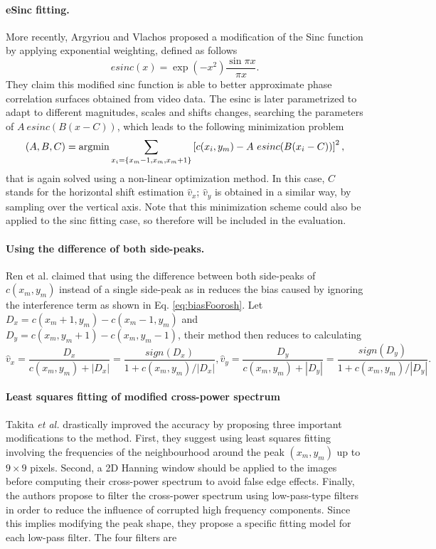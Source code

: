 \paragraph{eSinc fitting.}
More recently, Argyriou and Vlachos \cite{Argyriou2006} proposed a modification of the Sinc function by applying exponential weighting, defined as follows
\begin{equation}
esinc(x) = \exp(-x^2)\frac{\sin \pi x}{\pi x}.
\end{equation}
They claim this modified sinc function is able to better approximate phase correlation surfaces obtained from video data. The esinc is later parametrized to adapt to different magnitudes, scales and shifts changes, searching the parameters of $A \ esinc(B(x-C))$, which leads to the following minimization problem
\begin{equation}
(A,B,C) = \operatorname*{\arg\!\min} \sum_{x_i=\{x_m -1,x_m,x_m+1\}} \left[c(x_i,y_m) - A \ esinc(B(x_i-C))\right]^2,
\end{equation}
that is again solved using a non-linear optimization method. In this case, $C$ stands for the horizontal shift estimation $\hat{v}_x$; $\hat{v}_y$ is obtained in a similar way, by sampling over the vertical axis. Note that this minimization scheme could also be applied to the sinc fitting case, so therefore will be included in the evaluation.

\paragraph{Using the difference of both side-peaks.}
Ren et al. \cite{Ren_2010} claimed that using the difference between both side-peaks of $c(x_m,y_m)$ instead of a single side-peak as in \cite{Foroosh2002} reduces the bias caused by ignoring the interference term as shown in Eq. \eqref{eq:biasFoorosh}. Let $D_x = c(x_m+1,y_m) - c(x_m-1,y_m)$ and $D_y = c(x_m,y_m+1) - c(x_m,y_m-1)$, their method then reduces to calculating
\begin{equation}
	\hat{v}_x\!=\!\frac{D_x}{c(x_m,y_m)\!+\!|D_x|}\!=\!\frac{sign(D_x)}{1\!+\!c(x_m,y_m)/|D_x|}, \hat{v}_y\!=\!\frac{D_y}{c(x_m,y_m)\!+\!|D_y|}\!=\!\frac{sign(D_y)}{1\!+\!c(x_m,y_m)/|D_y|}.
\end{equation}

\paragraph{Least squares fitting of modified cross-power spectrum}
Takita \emph{et al.} \cite{Takita2003} drastically improved the accuracy by proposing three important modifications to the method. First, they suggest using least squares fitting involving the frequencies of the neighbourhood around the peak $(x_m, y_m)$ up to $9 \times 9$ pixels. Second, a 2D Hanning window should be applied to the images before computing their cross-power spectrum to avoid false edge effects. Finally, the authors propose to filter the cross-power spectrum using low-pass-type filters in order to reduce the influence of corrupted high frequency components. Since this implies modifying the peak shape, they propose a specific fitting model for each low-pass filter. The four filters are

